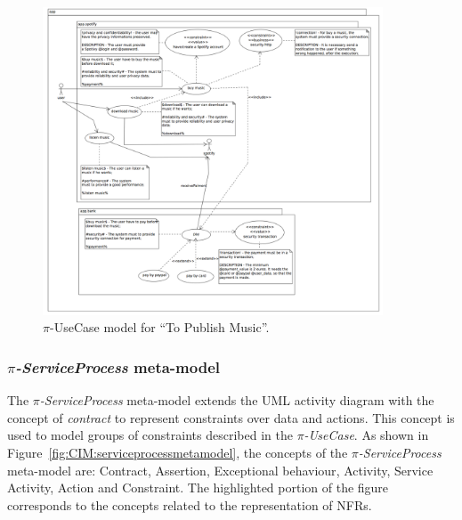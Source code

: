 \begin{figure}[htpb]
\center
\includegraphics[width=0.9\textwidth]{figs/UseCase.pdf}
\caption{\label{fig:CIM:piusecasetpm} $\pi$-UseCase model for ``To Publish Music''.}
\end{figure}
 

\subsubsection{\textit{$\pi$-ServiceProcess} meta-model}%

The \textit{$\pi$-ServiceProcess} meta-model extends the UML activity diagram with the concept of \textit{contract} to represent constraints over data and actions. This concept is used to model 
groups  of  constraints described in the \textit{$\pi$-UseCase}. 
As shown in Figure~\ref{fig:CIM:serviceprocessmetamodel}, the concepts of the \textit{$\pi$-ServiceProcess} meta-model are: {\sc Contract}, {\sc Assertion}, {\sc Exceptional behaviour}, {\sc Activity}, {\sc Service Activity}, {\sc Action} and {\sc Constraint}.
The highlighted portion of the figure corresponds to the concepts related to the representation of NFRs.

